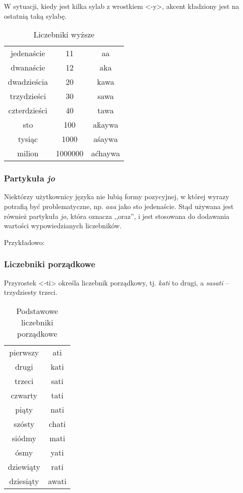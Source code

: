 \begin{spacing}{1.1}
W sytuacji, kiedy jest kilka sylab z wrostkiem <-y>, akcent kładziony jest na
ostatnią taką sylabę.

\begin{table}[ht]
	\centering
	\caption{Liczebniki wyższe}
	\begin{tabular}{ccc} \toprule
		jedenaście & 11 & aa \\
		dwanaście & 12 & aka \\
		dwadzieścia & 20 & kawa \\
		trzydzieści & 30 & sawa \\
		czterdzieści & 40 & tawa \\
		sto & 100 & aḱaywa  \\
		tysiąc & 1000 & aśaywa \\
		milion & 1000000 & aćhaywa \\\bottomrule
	\end{tabular}
	\label{tab:numerals2}
\end{table}

\subsubsection{Partykuła \emph{jo}}

Niektórzy użytkownicy języka nie lubią formy pozycyjnej, w której wyrazy
potrafią być problematyczne, np. \emph{aaa} jako sto jedenaście. Stąd używana
jest również partykuła \emph{jo}, która oznacza ,,oraz'', i jest stosowana do
dodawania wartości wypowiedzianych liczebników.

Przykładowo:




\subsubsection{Liczebniki porządkowe}

Przyrostek <-ti> określa liczebnik porządkowy, tj. \emph{kati} to drugi, a
\emph{sasati} -- trzydziesty trzeci.

\begin{table}[ht]
\centering
\caption{Podstawowe liczebniki porządkowe}
\begin{tabular}{cc} \toprule
	pierwszy & ati \\
	drugi & kati \\
	trzeci & sati \\
	czwarty & tati \\
	piąty & nati \\
	szósty & chati \\
	siódmy & mati \\
	ósmy & yati \\
	dziewiąty & rati \\
	dziesiąty & awati \\\bottomrule
\end{tabular}
\label{tab:numerals3}
\end{table}


\end{spacing}
